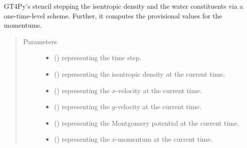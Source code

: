 \documentclass[letterpaper,10pt,english]{sphinxmanual}
\begin{document}
\begin{fulllineitems}
\begin{fulllineitems}
\begin{quote}
\begin{description}
\end{description}\end{quote}

\end{fulllineitems}


\begin{fulllineitems}
\label{\detokenize{api:dycore.prognostic_isentropic.PrognosticIsentropicTL1._defs_stencil_isentropic_density_and_water_constituents}}
GT4Py’s stencil stepping the isentropic density and the water constituents via a one-time-level scheme.
Further, it computes the provisional values for the momentums.
\begin{quote}\begin{description}
\item[{Parameters}] \leavevmode\begin{itemize}
\item {} 
 () \textendash{}  representing the time step.

\item {} 
 () \textendash{}  representing the isentropic density at the current time.

\item {} 
 () \textendash{}  representing the \(x\)-velocity at the current time.

\item {} 
 () \textendash{}  representing the \(y\)-velocity at the current time.

\item {} 
 () \textendash{}  representing the Montgomery potential at the current time.

\item {} 
 () \textendash{}  representing the \(x\)-momentum at the current time.


\end{itemize}
\end{description}
\end{quote}
\end{fulllineitems}
\end{fulllineitems}
\end{document}
